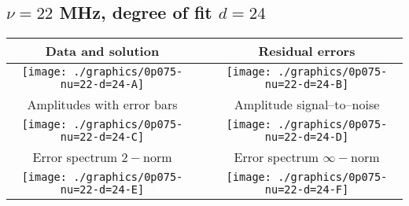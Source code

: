 

% 

\clearpage{}
\break{}

\subsection{$\nu = 22$ MHz, degree of fit $d = 24$}

\begin{table}[h]
    \begin{center}
        \begin{tabular}{ccc}
            Data and solution & \quad & Residual errors \\\hline
            \texttt{[image: ./graphics/0p075-nu=22-d=24-A]} &&
            \texttt{[image: ./graphics/0p075-nu=22-d=24-B]} \\[15pt]
            Amplitudes with error bars && Amplitude signal--to--noise \\\hline
            \texttt{[image: ./graphics/0p075-nu=22-d=24-C]} &&
            \texttt{[image: ./graphics/0p075-nu=22-d=24-D]} \\[15pt]
            Error spectrum $2-$norm && Error spectrum $\infty-$norm \\\hline
            \texttt{[image: ./graphics/0p075-nu=22-d=24-E]} &&
            \texttt{[image: ./graphics/0p075-nu=22-d=24-F]} \\[15pt]
        \end{tabular}
    \end{center}
\label{fig:elev=75, nu=22}
\end{table}



\endinput
